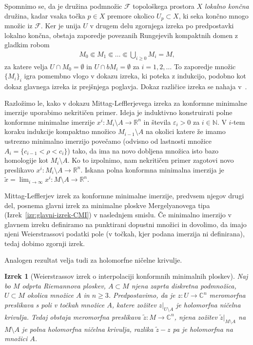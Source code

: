 \documentclass[12pt,a4paper,twoside]{article}
\theoremstyle{definition} %
\theoremstyle{plain} %
\newtheorem{izrek}[definicija]{Izrek}
\numberwithin{equation}{section}  %
\newcommand{\R}{\mathbb R}
\newcommand{\N}{\mathbb N}
\newcommand{\C}{\mathbb C}
\begin{document}
Spomnimo se, da je družina podmnožic $\mathcal{F}$ topološkega prostora $X$ \emph{lokalno končna} družina, kadar vsaka točka $p \in X$ premore okolico $U_{p} \subset X$, ki seka končno mnogo množic iz $\mathcal{F}$.
Ker je unija $U$ v drugem delu zgornjega izreka po predpostavki lokalno končna, obstaja zaporedje povezanih Rungejevih kompaktnih domen z gladkim robom
\begin{gather*}
M_{0} \Subset M_{1} \Subset \dots \Subset \bigcup_{i \geq 0} M_{i}=M,
\end{gather*}
za katere velja $U \cap M_{0} = \emptyset$ in $U \cap bM_{i} = \emptyset$ za $i = 1,2,\dots$ To zaporedje množic $\{ M_{i} \}_{i}$ igra pomembno vlogo v dokazu izreka, ki poteka z indukcijo, podobno kot dokaz glavnega izreka iz prejšnjega poglavja.
Dokaz različice izreka se nahaja v~\cite[Theorem~7.1]{alarcon2019algebraic}. %

Razložimo le, kako v dokazu Mittag-Lefflerjevega izreka za konformne minimalne imerzije uporabimo nekritičen primer. Ideja je induktivno konstruirati polne konformne minimalne imerzije $x^{i} \colon M_{i}\setminus A \to \R^{n}$ in števila $\varepsilon_{i}>0$ za $i \in \N$. V $i$-tem koraku indukcije kompaktno množico $M_{i-1} \setminus A$ na okolici katere že imamo ustrezno minimalno imerzijo povečamo (odvisno od lastnosti množice $A_{i} = \{ c_{i-1} < \rho < c_{i} \}$) tako, da ima na novo dobljena množica isto bazo homologije kot $M_{i} \setminus A$. Ko to izpolnimo, nam nekritičen primer zagotovi novo preslikavo $x^{i} \colon M_{i} \setminus A \to \R^{n}$. Iskana polna konformna minimalna imerzija je $\tilde{x} = \lim_{i \to \infty}x^{i} \colon M \setminus A \to \R^{n}$. \newline

Mittag-Lefflerjev izrek za konformne minimalne imerzije, predvsem njegov drugi del, posnema glavni izrek za minimalne ploskve Mergelyanovega tipa (Izrek~\ref{izr:glavni-izrek-CMI}) v naslednjem smislu. Če minimalno imerzijo v glavnem izreku definiramo na punktirani dopustni množici in dovolimo, da imajo njeni Weierstrassovi podatki pole (v točkah, kjer podana imerzija ni definirana), tedaj dobimo zgornji izrek.

Analogen rezultat velja tudi za holomorfne ničelne krivulje.

\begin{izrek} [Weierstrassov izrek o interpolaciji konformnih minimalnih ploskev] \label{izr:Weierstrass-CMI}
Naj bo $M$ odprta Riemannova ploskev, $A \subset M$ njena zaprta diskretna podmnožica, $U \subset M$ okolica množice $A$ in $n \geq 3$.
Predpostavimo, da je $z \colon U \to \C^{n}$ meromorfna preslikava s poli v točkah množice $A$, katere zožitev $z|_{U \setminus A}$ je holomorfna ničelna krivulja.
Tedaj obstaja meromorfna preslikava $\tilde{z} \colon M \to \C^{n}$, njena zožitev $\tilde{z}|_{M \setminus A}$ na $M \setminus A$ je polna holomorfna ničelna krivulja, razlika $\tilde{z}-z$ pa je holomorfna na množici $A$.
\end{izrek}
\end{document}
